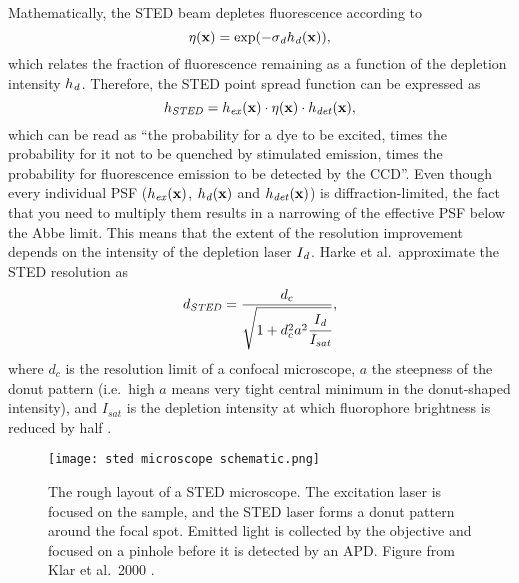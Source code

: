 Mathematically, the STED beam depletes fluorescence according to
\begin{equation}
	\eta(\vb{x}) = \exp(-\sigma_{\mathit{d}} h_{\mathit{d}}(\vb{x})),
\end{equation}
which relates the fraction of fluorescence remaining as a function of the depletion intensity $ h_{\mathit{d}} $. Therefore, the STED point spread function can be expressed as
\begin{equation}
	h_\mathit{STED} = h_{\mathit{ex}}(\vb{x}) \cdot \eta(\vb{x}) \cdot h_\mathit{det}(\vb{x}),
\end{equation}
which can be read as ``the probability for a dye to be excited, times the probability for it not to be quenched by stimulated emission, times the probability for fluorescence emission to be detected by the CCD''. Even though every individual PSF ($ h_{\mathit{ex}}(\vb{x}) $, $ h_{\mathit{d}}(\vb{x}) $ and $ h_\mathit{det}(\vb{x}) $) is diffraction-limited, the fact that you need to multiply them results in a narrowing of the effective PSF below the Abbe limit. This means that the extent of the resolution improvement depends on the intensity of the depletion laser $ I_{\mathit{d}}$. Harke et al.~approximate the STED resolution as
\begin{equation}
	d_\mathit{STED} = \frac{d_c}{\sqrt{1+d_c^2a^2\cfrac{I_{\mathit{d}}}{I_\mathit{sat}}}},
\end{equation}
where $ d_c $ is the resolution limit of a confocal microscope, $ a $ the steepness of the donut pattern (i.e.~high $ a $ means very tight central minimum in the donut-shaped intensity), and $ I_\mathit{sat} $ is the depletion intensity at which fluorophore brightness is reduced by half \cite{Harke2008}.

\begin{figure}
	\centering
	\texttt{[image: sted microscope schematic.png]}
	\caption{
		The rough layout of a STED microscope. The excitation laser is focused on the sample, and the STED laser forms a donut pattern around the focal spot. Emitted light is collected by the objective and focused on a pinhole before it is detected by an APD. Figure from Klar et al.~2000 \cite{Klar2000}.
	}
	\label{fig:sted microscope}
\end{figure}

